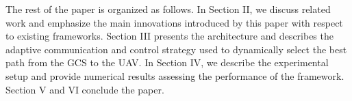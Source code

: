The rest of the paper is organized as follows. In Section II, we discuss related work and emphasize the main innovations introduced by this paper with respect to existing frameworks. Section III presents the architecture and describes the adaptive communication and control strategy used to dynamically select the best path from the GCS to the UAV. In Section IV, we describe the experimental setup and provide numerical results assessing the performance of the framework. Section V and VI conclude the paper.
